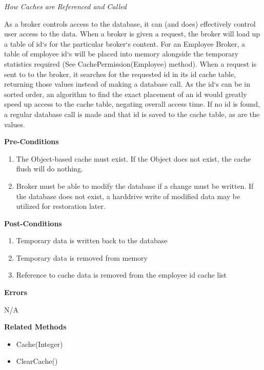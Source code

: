 \documentclass[letterpaper,12pt]{report}
\begin{document}
{\begin{description}
	\par \noindent
	\textit{How Caches are Referenced and Called}
	\par \noindent \hspace*{1cm} As a broker controls access to the database, it can (and does) effectively control user access to the data. When a broker is given a request, the broker will load up a table of id`s for the particular broker`s content. For an Employee Broker, a table of employee id`s will be placed into memory alongside the temporary statistics required (See CachePermission(Employee) method). When a request is sent to to the broker, it searches for the requested id in its id cache table, returning those values instead of making a database call. As the id`s can be in sorted order, an algorithm to find the exact placement of an id would greatly speed up access to the cache table, negating overall access time. If no id is found, a regular database call is made and that id is saved to the cache table, as are the values. 
     \item \textbf{Pre-Conditions}
	\begin{enumerate}
	   \item The Object-based cache must exist. If the Object does not exist, the cache flush will do nothing.
	   \item Broker must be able to modify the database if a change must be written. If the database does not exist, a harddrive write of modified data may be utilized for restoration later.
	  \end{enumerate}
     \item \textbf{Post-Conditions}
	\begin{enumerate}
	 \item Temporary data is written back to the database
	 \item Temporary data is removed from memory
	 \item Reference to cache data is removed from the employee id cache list
	\end{enumerate}
     \item[] \textbf{Errors}
	\par \noindent \hspace*{1cm} N/A
     \item \textbf{Related Methods} 
     \begin{itemize}
      \item Cache(Integer)
      \item ClearCache()
     \end{itemize}

    \end{description}
}
\end{document}
